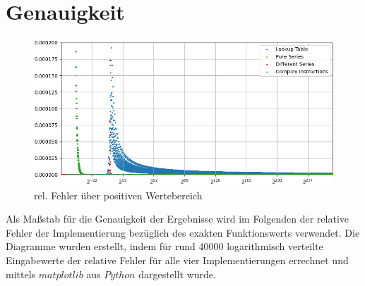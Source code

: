 \documentclass[course=erap] {aspdoc}
\begin{document}
    \section{Genauigkeit}\label{sec:genauigkeit}

    \begin{figure}[h]
        \centering
        \includegraphics[width=12cm,height=5.5cm]{images/Figure3}
        \caption{rel. Fehler über positiven Wertebereich}
    \end{figure}


    Als Maßstab für die Genauigkeit der Ergebnisse wird im Folgenden der relative Fehler der Implementierung bezüglich des exakten Funktionswerts verwendet.
    Die Diagramme wurden erstellt, indem für rund 40000 logarithmisch verteilte Eingabewerte der relative Fehler für alle vier Implementierungen errechnet und mittels $matplotlib$ aus $Python$ dargestellt wurde.
\end{document}
